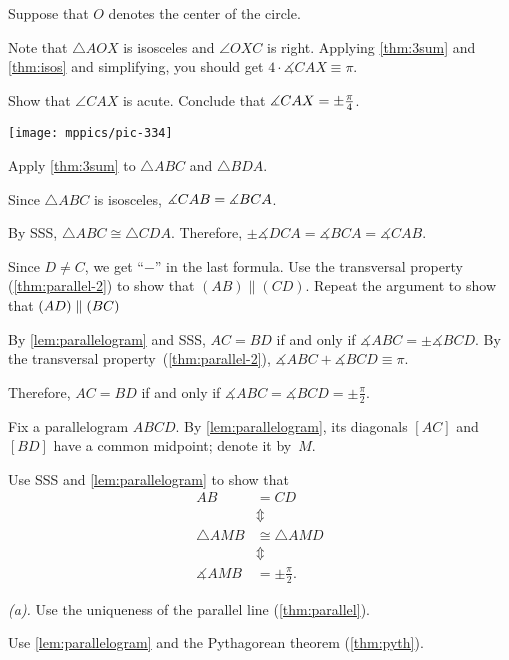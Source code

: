 \begin{multicols}{2}
Suppose that $O$ denotes the center of the circle.

Note that $\triangle AOX$ is isosceles
and $\angle OXC$ is right.
Applying \ref{thm:3sum} and \ref{thm:isos} and simplifying, you should get
$
4\cdot \measuredangle CAX
\equiv
\pi$.

Show that $\angle CAX$ is acute.
Conclude that 
$\measuredangle CAX\z=\pm\tfrac\pi4$.

\begin{Figure}
\vskip-0mm
\centering
\texttt{[image: mppics/pic-334]}
\end{Figure}

Apply \ref{thm:3sum} to $\triangle ABC$ and $\triangle BDA$.


Since $\triangle ABC$ is isosceles, $\measuredangle CAB\z=\measuredangle BCA$.
 
By SSS, $\triangle ABC\cong \triangle CDA$.
Therefore, 
$\pm\measuredangle DCA= \measuredangle BCA=\measuredangle CAB$.

Since $D\ne C$, we get ``$-$'' in the last formula.
Use the transversal property (\ref{thm:parallel-2}) to show that $(AB)\parallel (CD)$. Repeat the argument to show that $(AD)\z\parallel(BC)$ 

By \ref{lem:parallelogram} and SSS, 
$AC=BD$
if and only if
$\measuredangle ABC=\pm \measuredangle BCD$.
By the transversal property~(\ref{thm:parallel-2}), 
$\measuredangle ABC+\measuredangle BCD\equiv \pi$.

Therefore, 
$AC=BD$
if and only if
$\measuredangle ABC
=\measuredangle BCD
=\pm\tfrac\pi2$.

Fix a parallelogram $ABCD$.
By \ref{lem:parallelogram},
its diagonals $[AC]$ and $[BD]$ have a common midpoint; denote it by~$M$.

Use SSS and \ref{lem:parallelogram} to show that
\begin{align*}
AB&=CD
\\
&\Updownarrow
\\
\triangle AMB
&\cong
\triangle AMD
\\
&\Updownarrow
\\
\measuredangle AMB
&=
\pm\tfrac\pi2.
\end{align*}

 \textit{(a).} Use the uniqueness of the parallel line (\ref{thm:parallel}).

 Use \ref{lem:parallelogram} and the Pythagorean theorem (\ref{thm:pyth}).


\end{multicols}
